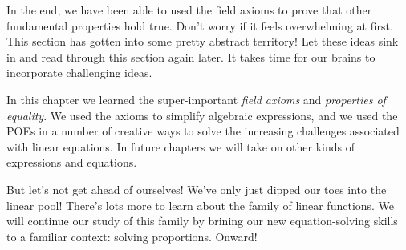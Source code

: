 In the end, we have been able to used the field axioms to prove that other fundamental properties hold true. Don't worry if it feels overwhelming at first. This section has gotten into some pretty abstract territory! Let these ideas sink in and read through this section again later. It takes time for our brains to incorporate challenging ideas.

\chaptersummary

In this chapter we learned the super-important \textit{field axioms} and \textit{properties of equality}. We used the axioms to simplify algebraic expressions, and we used the POEs in a number of creative ways to solve the increasing challenges associated with linear equations. In future chapters we will take on other kinds of expressions and equations.

But let's not get ahead of ourselves! We've only just dipped our toes into the linear pool! There's lots more to learn about the family of linear functions. We will continue our study of this family by brining our new equation-solving skills to a familiar context: solving proportions. Onward!
